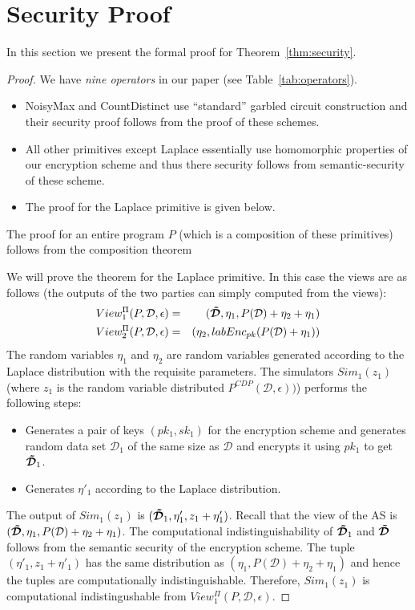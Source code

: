 \section{Security Proof}\label{sec:proof}
In this section we present the formal proof for Theorem~\ref{thm:security}.
\begin{proof}
 We have {\it nine operators} in our paper (see Table~\ref{tab:operators}).
\begin{itemize}
\item \textsf{NoisyMax} and \textsf{CountDistinct} use
  ``standard'' garbled circuit construction and their security proof
  follows from the proof of these schemes.

\item All other primitives except \textsf{Laplace} essentially use 
homomorphic properties of our encryption scheme and thus there 
security follows from semantic-security of these scheme.

\item The proof for the \textsf{Laplace} primitive is given below.
\end{itemize}
The proof for an entire program $P$ (which is a composition 
of these primitives) follows from the composition theorem~\cite[Section 7.3.1]{Oded}

We will prove the theorem for the \textsf{Laplace} primitive.
In this case the views are as follows (the outputs of the
two parties can simply computed from the views):
\begin{eqnarray*}
View_1^{\Pi}(P,\mathcal{D},\epsilon) & = & (\boldsymbol{\tilde{\mathcal{D}}},\eta_1,P(\mathcal{D})+\eta_2+\eta_1) \\
View_2^{\Pi}(P,\mathcal{D},\epsilon) & = & (\eta_2,labEnc_{pk} (P(\mathcal{D})+\eta_1))
\end{eqnarray*}
The random variables $\eta_1$ and $\eta_2$ are random variables
generated according to the Laplace distribution with the requisite
parameters. The simulators $Sim_1 (z_1)$ (where $z_1$ is the random
variable distributed $P^{CDP}(\mathcal{D},\epsilon))$) performs the
following steps:
\begin{itemize}
\item Generates a pair of keys $(pk_1,sk_1)$ for the encryption scheme
  and generates random data set $\mathcal{D}_1$ of the same size as $\mathcal{D}$ and
  encrypts it using $pk_1$ to get $\boldsymbol{\tilde{\mathcal{D}}}_1$.

\item Generates $\eta'_1$ according to the Laplace distribution.
\end{itemize}
The output of $Sim_1 (z_1)$ is $(\boldsymbol{\tilde{\mathcal{D}}}_1,\eta'_1,z_1+\eta'_1)$.
Recall that the view of the \textsf{AS} is
$(\boldsymbol{\tilde{\mathcal{D}}},\eta_1,P(\mathcal{D})+\eta_2+\eta_1)$.  The computational
indistinguishability of $\boldsymbol{\tilde{\mathcal{D}}}_1$ and $\boldsymbol{\tilde{\mathcal{D}}}$ follows from the
semantic security of the encryption scheme. The tuple
$(\eta'_1,z_1+\eta'_1)$ has the same distribution as
$(\eta_1,P(\mathcal{D})+\eta_2+\eta_1)$ and hence the tuples are
computationally indistinguishable.  Therefore, $Sim_1 (z_1)$ is
computational indistingushable from $View_1^{\Pi}(P,\mathcal{D},\epsilon)$.



\end{proof}
